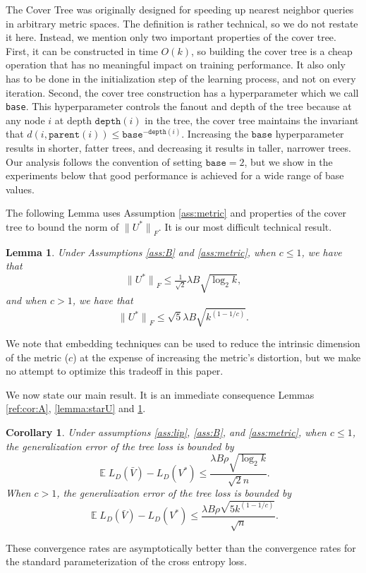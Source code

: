 \documentclass[twoside]{article}
\newtheorem{lemma}{Lemma}
\newtheorem{corollary}{Corollary}
\DeclareMathOperator{\E}{\mathbb E}
\newcommand{\parent}[1]{\texttt{parent}({#1})}
\renewcommand{\star}[1]{{#1}^{*}}
\newcommand{\lF}[1]{{\lVert {#1} \rVert}_F}
\newcommand{\depth}[1]{\texttt{depth}({#1})}
\begin{document}
The Cover Tree was originally designed for speeding up nearest neighbor queries in arbitrary metric spaces.
The definition is rather technical, so we do not restate it here.
Instead, we mention only two important properties of the cover tree.
First, it can be constructed in time $O(k)$,
so building the cover tree is a cheap operation that has no meaningful impact on training performance.
It also only has to be done in the initialization step of the learning process, and not on every iteration.
Second, the cover tree construction has a hyperparameter which we call \texttt{base}.
This hyperparameter controls the fanout and depth of the tree because at any node $i$ at depth $\depth{i}$ in the tree,
the cover tree maintains the invariant that $d(i, \parent{i}) \le \texttt{base}^{-\depth{i}}$.
Increasing the $\texttt{base}$ hyperparameter results in shorter, fatter trees,
and decreasing it results in taller, narrower trees.
Our analysis follows the convention of setting $\texttt{base}=2$,
but we show in the experiments below that good performance is achieved for a wide range of base values.

The following Lemma uses Assumption \ref{ass:metric} and properties of the cover tree to bound the norm of $\lF{\star U}$.
It is our most difficult technical result.
\begin{lemma}
    \label{lemma:main}
    Under Assumptions \ref{ass:B} and \ref{ass:metric},
    when $c\le1$, we have that
    \begin{equation}
        \lF{\star U} \le \tfrac{1}{\sqrt2}\lambda B \sqrt{\log_2 k},
        \label{eq:c<=1}
    \end{equation}
    and when $c>1$, we have that
    \begin{equation}
        \lF{\star U} \le \sqrt{5}\lambda B \sqrt{k^{(1-1/c)}}.
        \label{eq:c>1}
    \end{equation}
\end{lemma}

We note that embedding techniques can be used to reduce the intrinsic dimension of the metric ($c$) at the expense of increasing the metric's distortion,
but we make no attempt to optimize this tradeoff in this paper.

We now state our main result.
It is an immediate consequence Lemmas \ref{ref:cor:A}, \ref{lemma:starU} and \ref{lemma:main}.
\begin{corollary}
    \label{cor:main}
    Under assumptions \ref{ass:lip}, \ref{ass:B}, and \ref{ass:metric},
    when $c\le1$, the generalization error of the tree loss is bounded by
\begin{equation}
    \E L_D(\bar V) - L_D(V^*)
    \le \frac {\lambda B\rho \sqrt{\log_2 k}}{\sqrt 2n}
    .
\end{equation}
    When $c>1$, the generalization error of the tree loss is bounded by
\begin{equation}
    \E L_D(\bar V) - L_D(V^*)
    \le \frac {\lambda B\rho \sqrt{5 k^{(1-1/c)}}}{\sqrt n}
    .
\end{equation}
\end{corollary}
These convergence rates are asymptotically better than the convergence rates for the standard parameterization of the cross entropy loss.
\end{document}
